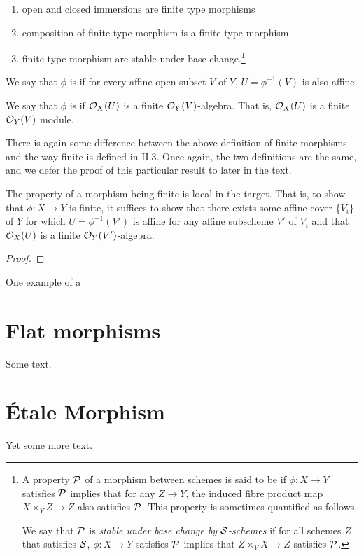 \begin{cor}
\begin{enumerate}
\item open and closed immersions are finite type morphisms

\item composition of finite type morphism is a finite type 
morphism

\item finite type morphism are stable under base change.\footnote{
A property $\mathcal{P}$ of a morphism between schemes is said to 
be  if 
$\phi: X \to Y$ satisfies $\mathcal{P}$ implies that for any $Z 
\to Y$, the induced fibre product map $X \times_Y Z \to Z$ also 
satisfies $\mathcal{P}$. This property is sometimes quantified as 
follows.

We say that $\mathcal{P}$ is \emph{stable under base change by 
$\mathcal{S}$-schemes} if for all schemes $Z$ that satisfies 
$\mathcal{S}$, $\phi : X \to Y$ satisfies $\mathcal{P}$ implies 
that $Z \times_Y X \to Z$ satisfies $\mathcal{P}$.}

\end{enumerate}
\end{cor}

\begin{defn}
We say that $\phi$ is  if for every 
affine open subset $V$ of $Y$, $U = \phi^{-1}(V)$ is also affine.

We say that $\phi$ is  if 
$\mathcal{O}_X(U)$ is a finite $\mathcal{O}_Y(V)$-algebra. That is, $\mathcal{O}_X(U)$ is
a finite $\mathcal{O}_Y(V)$ module.
\end{defn}

There is again some difference between the above definition of
finite morphisms and the way finite is defined in \cite{Hart}
II.3. Once again, the two definitions are the same, and we defer
the proof of this particular result to later in the text.

\begin{prop}
The property of a morphism being finite is local in the target.
That is, to show that $\phi: X \to Y$ is finite, it suffices to
show that there exists some affine cover $\{V_i\}$ of $Y$ for 
which $U = \phi^{-1}(V')$ is affine for any affine subscheme $V'$ 
of $V_i$ and that $\mathcal{O}_X(U)$ is a finite $\mathcal{O}_Y(V')$-algebra.
\end{prop}
\begin{proof}

\end{proof}

One example of a 

\section{Flat morphisms}

Some text.

\section{\'Etale Morphism}

Yet some more text.
